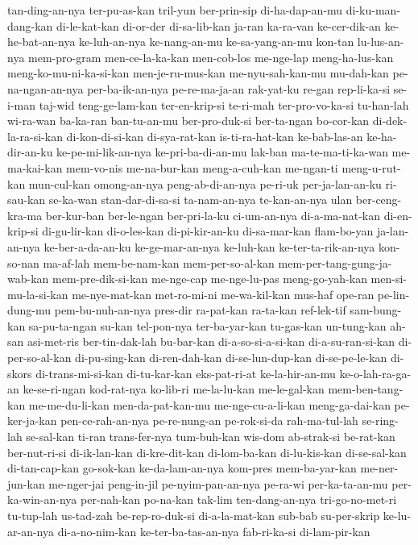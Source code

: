 {tan-ding-an-nya ter-pu-as-kan tril-yun ber-prin-sip di-ha-dap-an-mu di-ku-man-dang-kan di-le-kat-kan di-or-der
di-sa-lib-kan ja-ran ka-ra-van ke-cer-dik-an ke-he-bat-an-nya ke-luh-an-nya ke-nang-an-mu ke-sa-yang-an-mu
kon-tan lu-lus-an-nya mem-pro-gram men-ce-la-ka-kan men-cob-los me-nge-lap meng-ha-lus-kan meng-ko-mu-ni-ka-si-kan
men-je-ru-mus-kan me-nyu-sah-kan-mu mu-dah-kan pe-na-ngan-an-nya per-ba-ik-an-nya pe-re-ma-ja-an rak-yat-ku re-gan
rep-li-ka-si se-i-man taj-wid teng-ge-lam-kan ter-en-krip-si te-ri-mah ter-pro-vo-ka-si tu-han-lah
wi-ra-wan ba-ka-ran ban-tu-an-mu ber-pro-duk-si ber-ta-ngan bo-cor-kan di-dek-la-ra-si-kan di-kon-di-si-kan
di-sya-rat-kan is-ti-ra-hat-kan ke-bab-las-an ke-ha-dir-an-ku ke-pe-mi-lik-an-nya ke-pri-ba-di-an-mu lak-ban ma-te-ma-ti-ka-wan
me-ma-kai-kan mem-vo-nis me-na-bur-kan meng-a-cuh-kan me-ngan-ti meng-u-rut-kan mun-cul-kan omong-an-nya
peng-ab-di-an-nya pe-ri-uk per-ja-lan-an-ku ri-sau-kan se-ka-wan stan-dar-di-sa-si ta-nam-an-nya te-kan-an-nya
ulan ber-ceng-kra-ma ber-kur-ban ber-le-ngan ber-pri-la-ku ci-um-an-nya di-a-ma-nat-kan di-en-krip-si
di-gu-lir-kan di-o-les-kan di-pi-kir-an-ku di-sa-mar-kan flam-bo-yan ja-lan-an-nya ke-ber-a-da-an-ku ke-ge-mar-an-nya
ke-luh-kan ke-ter-ta-rik-an-nya kon-so-nan ma-af-lah mem-be-nam-kan mem-per-so-al-kan mem-per-tang-gung-ja-wab-kan mem-pre-dik-si-kan
me-nge-cap me-nge-lu-pas meng-go-yah-kan men-si-mu-la-si-kan me-nye-mat-kan met-ro-mi-ni me-wa-kil-kan mus-haf
ope-ran pe-lin-dung-mu pem-bu-nuh-an-nya pres-dir ra-pat-kan ra-ta-kan ref-lek-tif sam-bung-kan
sa-pu-ta-ngan su-kan tel-pon-nya ter-ba-yar-kan tu-gas-kan un-tung-kan ah-san asi-met-ris
ber-tin-dak-lah bu-bar-kan di-a-so-si-a-si-kan di-a-su-ran-si-kan di-per-so-al-kan di-pu-sing-kan di-ren-dah-kan di-se-lun-dup-kan
di-se-pe-le-kan di-skors di-trans-mi-si-kan di-tu-kar-kan eks-pat-ri-at ke-la-hir-an-mu ke-o-lah-ra-ga-an ke-se-ri-ngan
kod-rat-nya ko-lib-ri me-la-lu-kan me-le-gal-kan mem-ben-tang-kan me-me-du-li-kan men-da-pat-kan-mu me-nge-cu-a-li-kan
meng-ga-dai-kan pe-ker-ja-kan pen-ce-rah-an-nya pe-re-nung-an pe-rok-si-da rah-ma-tul-lah se-ring-lah se-sal-kan
ti-ran trans-fer-nya tum-buh-kan wis-dom ab-strak-si be-rat-kan ber-nut-ri-si di-ik-lan-kan
di-kre-dit-kan di-lom-ba-kan di-lu-kis-kan di-se-sal-kan di-tan-cap-kan go-sok-kan ke-da-lam-an-nya kom-pres
mem-ba-yar-kan me-ner-jun-kan me-nger-jai peng-in-jil pe-nyim-pan-an-nya pe-ra-wi per-ka-ta-an-mu per-ka-win-an-nya
per-nah-kan po-na-kan tak-lim ten-dang-an-nya tri-go-no-met-ri tu-tup-lah us-tad-zah be-rep-ro-duk-si
di-a-la-mat-kan sub-bab su-per-skrip ke-lu-ar-an-nya di-a-no-nim-kan ke-ter-ba-tas-an-nya fab-ri-ka-si di-lam-pir-kan
}

